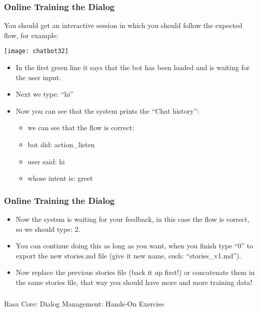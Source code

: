  \begin{frame}[fragile]\frametitle{Online Training the Dialog}
You should get an interactive session in which you should follow the expected flow, for example:
 
\begin{center}
\texttt{[image: chatbot32]}
\end{center}

\begin{itemize}
\item In the first green line it says that the bot has been loaded and is waiting for the user input.
\item Next we type: ``hi''
\item Now you can see that the system prints the ``Chat history'':
\begin{itemize}
\item we can see that the flow is correct:
\item bot did: action\_listen
\item user said: hi
\item whose intent is: greet
\end{itemize}
\end{itemize}

\end{frame}

 \begin{frame}[fragile]\frametitle{Online Training the Dialog}
\begin{itemize}
\item Now the system is waiting for your feedback, in this case the flow is correct, so we should type: 2.
\item You can continue doing this as long as you want, when you finish type ``0'' to export the new stories.md file (give it new name, such: ``stories\_v1.md'').
\item Now replace the previous stories file (back it up first!) or concatenate them in the same stories file, that way you should have more and more training data!
\end{itemize}

\end{frame}


\begin{frame}[fragile]\frametitle{}
\begin{center}

{\Large Rasa Core: Dialog Management: Hands-On Exercise}

\end{center}
\end{frame}

